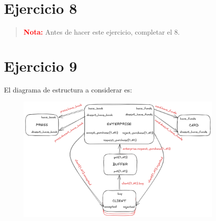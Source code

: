 \documentclass{article}
\begin{document}
\section*{Ejercicio 8}
\begin{quotation}
	\textbf{\textcolor{red}{Nota:}} Antes de hacer este ejercicio, completar el 8.
\end{quotation}

\section*{Ejercicio 9}
El diagrama de estructura a considerar es:
\begin{figure}[!htb]
	\includegraphics[width=0.9\textwidth]{02-09.png}
	\centering
\end{figure}
\end{document}
